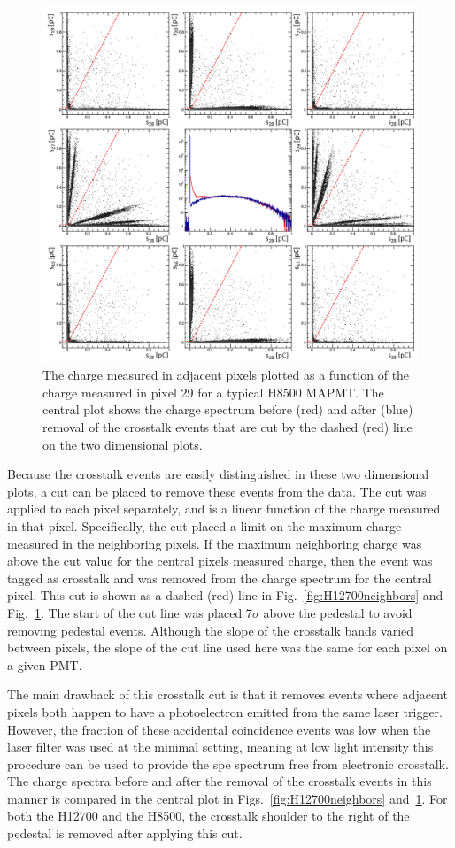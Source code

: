 \begin{figure}[hbt]
	\includegraphics[width=\linewidth]{figures/H8500_ct.png}
	\caption{The charge measured in adjacent pixels plotted as a function of the charge measured in pixel 29 for a typical H8500 MAPMT. The central plot shows the charge spectrum before (red) and after (blue) removal of the crosstalk events that are cut by the dashed (red) line on the two dimensional plots.}
	\label{fig:H8500neighbors}
\end{figure}

Because the crosstalk events are easily distinguished in these two dimensional plots, a cut can be placed to remove these events from the data. The cut was applied to each pixel separately, and is a linear function of the charge measured in that pixel. Specifically, the cut placed a limit on the maximum charge measured in the neighboring pixels. If the maximum neighboring charge was above the cut value for the central pixel\textquotesingle s measured charge, then the event was tagged as crosstalk and was removed from the charge spectrum for the central pixel. This cut is shown as a dashed (red) line in Fig.~\ref{fig:H12700neighbors} and Fig.~\ref{fig:H8500neighbors}. The start of the cut line was placed 7$\sigma$ above the pedestal to avoid removing pedestal events. Although the slope of the crosstalk bands varied between pixels, the slope of the cut line used here was the same for each pixel on a given PMT. 

The main drawback of this crosstalk cut is that it removes events where adjacent pixels both happen to have a photoelectron emitted from the same laser trigger. However, the fraction of these accidental coincidence events was low when the laser filter was used at the minimal setting, meaning at low light intensity this procedure can be used to provide the spe spectrum free from electronic crosstalk. The charge spectra before and after the removal of the crosstalk events in this manner is compared in the central plot in Figs.~\ref{fig:H12700neighbors} and~\ref{fig:H8500neighbors}. For both the H12700 and the H8500, the crosstalk shoulder to the right of the pedestal is removed after applying this cut. 
